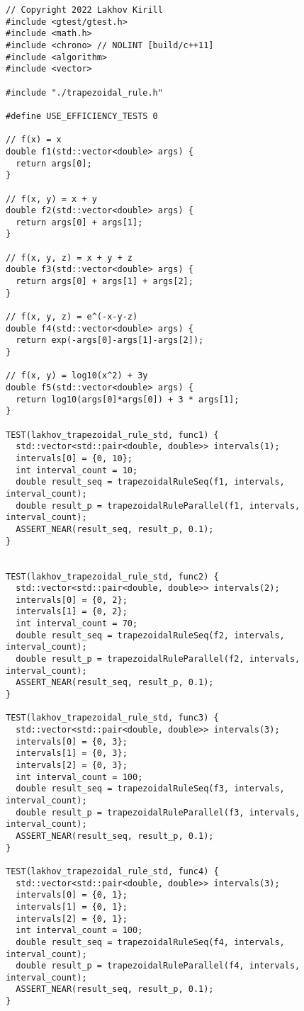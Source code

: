 \documentclass{report}
\begin{document}
\begin{lstlisting}
// Copyright 2022 Lakhov Kirill
#include <gtest/gtest.h>
#include <math.h>
#include <chrono> // NOLINT [build/c++11]
#include <algorithm>
#include <vector>

#include "./trapezoidal_rule.h"

#define USE_EFFICIENCY_TESTS 0

// f(x) = x
double f1(std::vector<double> args) {
  return args[0];
}

// f(x, y) = x + y
double f2(std::vector<double> args) {
  return args[0] + args[1];
}

// f(x, y, z) = x + y + z
double f3(std::vector<double> args) {
  return args[0] + args[1] + args[2];
}

// f(x, y, z) = e^(-x-y-z)
double f4(std::vector<double> args) {
  return exp(-args[0]-args[1]-args[2]);
}

// f(x, y) = log10(x^2) + 3y
double f5(std::vector<double> args) {
  return log10(args[0]*args[0]) + 3 * args[1];
}

TEST(lakhov_trapezoidal_rule_std, func1) {
  std::vector<std::pair<double, double>> intervals(1);
  intervals[0] = {0, 10};
  int interval_count = 10;
  double result_seq = trapezoidalRuleSeq(f1, intervals, interval_count);
  double result_p = trapezoidalRuleParallel(f1, intervals, interval_count);
  ASSERT_NEAR(result_seq, result_p, 0.1);
}


TEST(lakhov_trapezoidal_rule_std, func2) {
  std::vector<std::pair<double, double>> intervals(2);
  intervals[0] = {0, 2};
  intervals[1] = {0, 2};
  int interval_count = 70;
  double result_seq = trapezoidalRuleSeq(f2, intervals, interval_count);
  double result_p = trapezoidalRuleParallel(f2, intervals, interval_count);
  ASSERT_NEAR(result_seq, result_p, 0.1);
}

TEST(lakhov_trapezoidal_rule_std, func3) {
  std::vector<std::pair<double, double>> intervals(3);
  intervals[0] = {0, 3};
  intervals[1] = {0, 3};
  intervals[2] = {0, 3};
  int interval_count = 100;
  double result_seq = trapezoidalRuleSeq(f3, intervals, interval_count);
  double result_p = trapezoidalRuleParallel(f3, intervals, interval_count);
  ASSERT_NEAR(result_seq, result_p, 0.1);
}

TEST(lakhov_trapezoidal_rule_std, func4) {
  std::vector<std::pair<double, double>> intervals(3);
  intervals[0] = {0, 1};
  intervals[1] = {0, 1};
  intervals[2] = {0, 1};
  int interval_count = 100;
  double result_seq = trapezoidalRuleSeq(f4, intervals, interval_count);
  double result_p = trapezoidalRuleParallel(f4, intervals, interval_count);
  ASSERT_NEAR(result_seq, result_p, 0.1);
}


\end{lstlisting}
\end{document}
